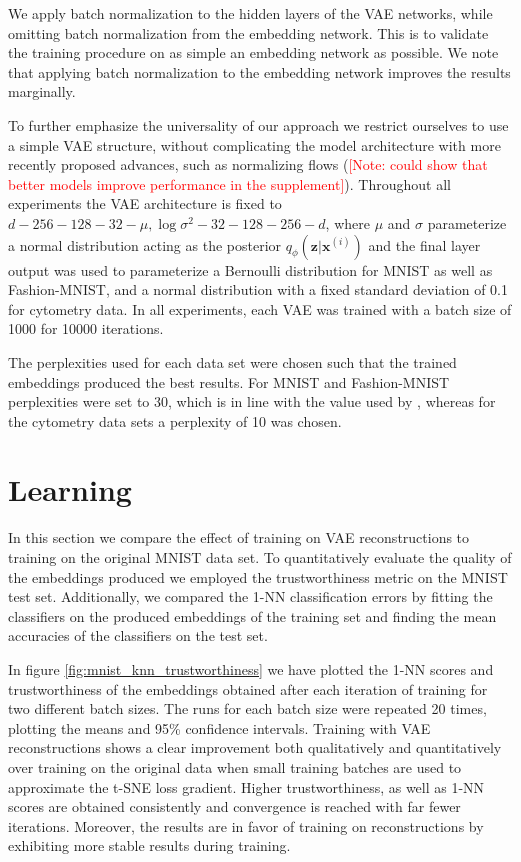 We apply batch normalization \citep{batch_normalization} to the hidden layers of the VAE networks, while omitting batch normalization from the embedding network. This is to validate the training procedure on as simple an embedding network as possible. We note that applying batch normalization to the embedding network improves the results marginally.

To further emphasize the universality of our approach we restrict ourselves to use a simple VAE structure, without complicating the model architecture with more recently proposed advances, such as normalizing flows \citep{normalizing_flows} (\textcolor{red}{[Note: could show that better models improve performance in the supplement]}). Throughout all experiments the VAE architecture is fixed to $d - 256 - 128 - 32 - \mu, \log \sigma^2 - 32 - 128 - 256 - d$, where $\mu$ and $\sigma$ parameterize a normal distribution acting as the posterior $q_{\phi}(\mathbf{z} \vert \mathbf{x}^{(i)})$ and the final layer output was used to parameterize a Bernoulli distribution for MNIST as well as Fashion-MNIST, and a normal distribution with a fixed standard deviation of 0.1 for cytometry data. In all experiments, each VAE was trained with a batch size of 1000 for 10000 iterations.

The perplexities used for each data set were chosen such that the trained embeddings produced the best results. For MNIST and Fashion-MNIST perplexities were set to 30, which is in line with the value used by \cite{parametric_tsne}, whereas for the cytometry data sets a perplexity of 10 was chosen.

\section{Learning}
\label{subsection:learning}

In this section we compare the effect of training on VAE reconstructions to training on the original MNIST data set. To quantitatively evaluate the quality of the embeddings produced we employed the trustworthiness metric \citep{trustworthiness} on the MNIST test set. Additionally, we compared the 1-NN classification errors by fitting the classifiers on the produced embeddings of the training set and finding the mean accuracies of the classifiers on the test set.

In figure \ref{fig:mnist_knn_trustworthiness} we have plotted the 1-NN scores and trustworthiness of the embeddings obtained after each iteration of training for two different batch sizes. The runs for each batch size were repeated 20 times, plotting the means and 95\% confidence intervals. Training with VAE reconstructions shows a clear improvement both qualitatively and quantitatively over training on the original data when small training batches are used to approximate the t-SNE loss gradient. Higher trustworthiness, as well as 1-NN scores are obtained consistently and convergence is reached with far fewer iterations. Moreover, the results are in favor of training on reconstructions by exhibiting more stable results during training.

